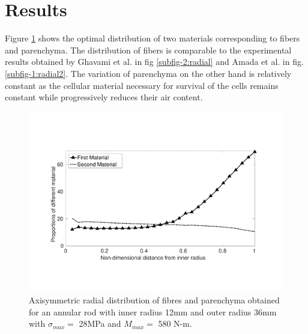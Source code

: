 \documentclass[openright,twoside]{iitkthesis}
\begin{document}
\section{Results}
Figure \ref{subfig-1:radial} shows the optimal distribution of two materials corresponding to fibers and parenchyma. The distribution of fibers is comparable to the experimental results obtained by Ghavami et al. \cite{ghavami2003bamboo} in fig \ref{subfig-2:radial} and Amada et al. \cite{amada1996mechanical} in fig. \ref{subfig-1:radial2}. The variation of parenchyma on the other hand is relatively constant as the cellular material necessary for survival of the cells remains constant while progressively reduces their air content.
\begin{figure}[H]
\begin{center}
\includegraphics[clip, trim=2cm 3cm 2cm 4cm,scale=0.48]{./Plots/normal/a77_1.pdf}
\caption{Axisymmetric radial distribution of fibres and parenchyma obtained for an annular rod    with inner radius 12mm and outer radius 36mm with $\sigma_{max} = $ 28MPa and $M_{max} = $ 580 N-m.}
\label{subfig-1:radial}
\end{center}
\end{figure}
\end{document}
